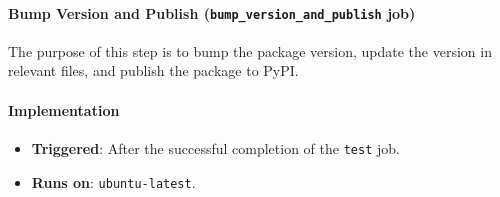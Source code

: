 \paragraph{Bump Version and Publish (\texttt{bump\_version\_and\_publish} job)}
The purpose of this step is to bump the package version, update the version in relevant files, and publish the package to PyPI.

\paragraph{Implementation}
\begin{itemize}
    \item \textbf{Triggered}: After the successful completion of the \texttt{test} job.
    \item \textbf{Runs on}: \texttt{ubuntu-latest}.
\end{itemize}

